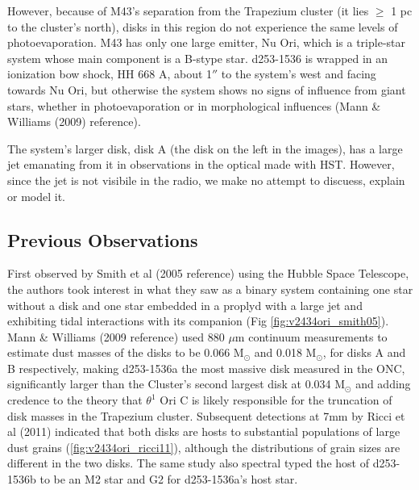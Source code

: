 However, because of M43's separation from the Trapezium cluster (it lies $\geq$ 1 pc to the cluster's north), disks in this region do not experience the same levels of photoevaporation. M43 has only one large emitter, Nu Ori, which is a triple-star system whose main component is a B-stype star. d253-1536 is wrapped in an ionization bow shock, HH 668 A, about 1$''$ to the system's west and facing towards Nu Ori, but otherwise the system shows no signs of influence from giant stars, whether in photoevaporation or in morphological influences (Mann \& Williams (2009) reference).

The system's larger disk, disk A (the disk on the left in the images), has a large jet emanating from it in observations in the optical made with HST. However, since the jet is not visibile in the radio, we make no attempt to discuess, explain or model it.



\subsection{Previous Observations}

\begin{figure}[htp]
  \hspace*{\fill}%
  \hfill%
  \hfill%
  \hfill%
  \hspace*{\fill}%
\end{figure}

First observed by Smith et al (2005 reference) using the Hubble Space Telescope, the authors took interest in what they saw as a binary system containing one star without a disk and one star embedded in a proplyd with a large jet and exhibiting tidal interactions with its companion (Fig \ref{fig:v2434ori_smith05}). Mann \& Williams (2009 reference) used 880 $\mu$m continuum measurements to estimate dust masses of the disks to be 0.066 M$_{\odot}$ and 0.018 M$_{\odot}$, for disks A and B respectively, making d253-1536a the most massive disk measured in the ONC, significantly larger than the Cluster's second largest disk at 0.034 M$_\odot$ and adding credence to the theory that $\theta^1$ Ori C is likely responsible for the truncation of disk masses in the Trapezium cluster. Subsequent detections at 7mm by Ricci et al (2011) indicated that both disks are hosts to substantial populations of large dust grains (\ref{fig:v2434ori_ricci11}), although the distributions of grain sizes are different in the two disks. The same study also spectral typed the host of d253-1536b to be an M2 star and G2 for d253-1536a's host star.

